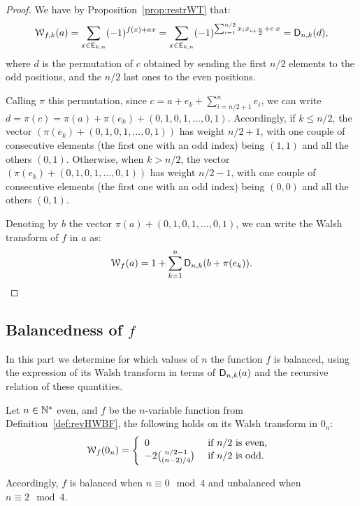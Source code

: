 \documentclass[11pt]{llncs}
\begin{document}
\begin{proof}
We have by Proposition~\ref{prop:restrWT} that:
\[
\mathcal{W}_{f,k}(a)=\sum_{x \in \mathsf{E}_{k,n}} (-1)^{f(x)+ax}=\sum_{x \in \mathsf{E}_{k,n}} (-1)^{\sum_{i=1}^{n/2} x_i x_{i+\frac{n}{2}}+ c \cdot x}=\mathsf{D}_{n,k}(d),\]
where $d$ is the permutation of $c$ obtained by sending the first $n/2$ elements to the odd positions, and the $n/2$ last ones to the even positions. 

Calling $\pi$ this permutation, since $c=a+e_k+\sum_{i=n/2+1}^n e_i$, we can write $d=\pi(c)=\pi(a)+ \pi(e_k)+ (0,1,0,1,\ldots,0,1)$. 
Accordingly, if $k\leq n/2$, the vector $(\pi(e_k)+ (0,1,0,1,\ldots,0,1))$ has weight $n/2+1$, with one couple of consecutive elements (the first one with an odd index) being $(1,1)$ and all the others $(0,1)$. 
Otherwise,  when $k> n/2$, the vector $(\pi(e_k)+ (0,1,0,1,\ldots,0,1))$ has weight $n/2-1$, with one couple of consecutive elements (the first one with an odd index) being $(0,0)$ and all the others $(0,1)$. 

Denoting by $b$ the vector $\pi(a)+(0,1,0,1,\ldots,0,1)$, we can write the Walsh transform of $f$ in $a$ as:
\[ \mathcal W_{f}(a)=1+\sum_{k=1}^n\mathsf{D}_{n,k}(b+\pi(e_k)).\qedhere\]
\end{proof}

\subsection{Balancedness of $f$}\label{sec:balancedness}

In this part we determine for which values of $n$ the function $f$ is balanced, using the expression of its Walsh transform in terms of $\mathsf{D}_{n,k}(a)$ and the recursive relation of these quantities.


\begin{theorem}\label{th:bal}
	Let $n \in \mathbb{N}^*$ even, and $f$ be the $n$-variable function from Definition~\ref{def:revHWBF}, the following holds on its Walsh transform in $0_n$:
	\[\mathcal W_{f}(0_n)= \left \{
	\begin{array}{l l}
	0 & \text{ if } n/2 \text{ is even, } \\
	-2 \binom{n/2-1}{(n-2)/4} & \text{ if }  n/2 \text{ is odd.}
	\end{array}\right.\]
	
	Accordingly, $f$ is balanced when $n \equiv 0\mod 4$ and unbalanced when $n\equiv 2 \mod 4$.
	
\end{theorem}
\end{document}

